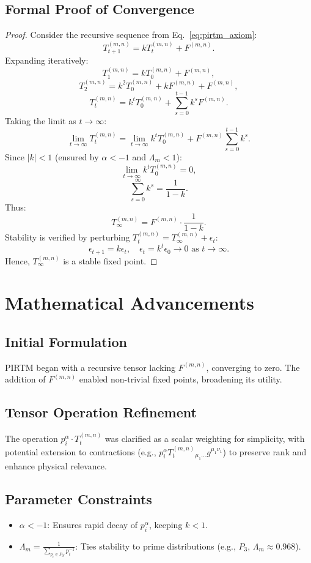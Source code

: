 \documentclass{article}
\theoremstyle{plain}
\begin{document}
\subsection{Formal Proof of Convergence}
\begin{proof}
Consider the recursive sequence from Eq.~\eqref{eq:pirtm_axiom}:
\[
T_{t+1}^{(m,n)} = k T_t^{(m,n)} + F^{(m,n)}.
\]
Expanding iteratively:
\[
T_1^{(m,n)} = k T_0^{(m,n)} + F^{(m,n)},
\]
\[
T_2^{(m,n)} = k^2 T_0^{(m,n)} + k F^{(m,n)} + F^{(m,n)},
\]
\[
T_t^{(m,n)} = k^t T_0^{(m,n)} + \sum_{s=0}^{t-1} k^s F^{(m,n)}.
\]
Taking the limit as \( t \to \infty \):
\[
\lim_{t \to \infty} T_t^{(m,n)} = \lim_{t \to \infty} k^t T_0^{(m,n)} + F^{(m,n)} \sum_{s=0}^{t-1} k^s.
\]
Since \( |k| < 1 \) (ensured by \( \alpha < -1 \) and \( \Lambda_m < 1 \)):
\[
\lim_{t \to \infty} k^t T_0^{(m,n)} = 0,
\]
\[
\sum_{s=0}^\infty k^s = \frac{1}{1 - k}.
\]
Thus:
\[
T_\infty^{(m,n)} = F^{(m,n)} \cdot \frac{1}{1 - k}.
\]
Stability is verified by perturbing \( T_t^{(m,n)} = T_\infty^{(m,n)} + \epsilon_t \):
\[
\epsilon_{t+1} = k \epsilon_t, \quad \epsilon_t = k^t \epsilon_0 \to 0 \text{ as } t \to \infty.
\]
Hence, \( T_\infty^{(m,n)} \) is a stable fixed point.
\end{proof}

\section{Mathematical Advancements}
\subsection{Initial Formulation}
PIRTM began with a recursive tensor lacking \( F^{(m,n)} \), converging to zero. The addition of \( F^{(m,n)} \) enabled non-trivial fixed points, broadening its utility.

\subsection{Tensor Operation Refinement}
The operation \( p_i^\alpha \cdot T_t^{(m,n)} \) was clarified as a scalar weighting for simplicity, with potential extension to contractions (e.g., \( p_i^\alpha T_t^{(m,n)}{}_{\mu_1 \dots} g^{\mu_1 \nu_1} \)) to preserve rank and enhance physical relevance.

\subsection{Parameter Constraints}
\begin{itemize}
    \item \( \alpha < -1 \): Ensures rapid decay of \( p_i^\alpha \), keeping \( k < 1 \).
    \item \( \Lambda_m = \frac{1}{\sum_{p_i \in P_N} p_i^{-1}} \): Ties stability to prime distributions (e.g., \( P_3 \), \( \Lambda_m \approx 0.968 \)).
\end{itemize}
\end{document}
